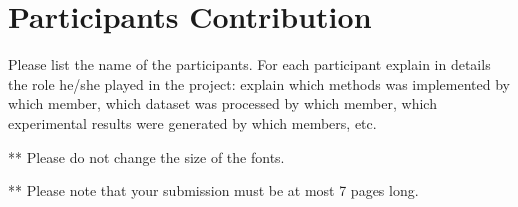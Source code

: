 \documentclass[11.5pt]{article}
\begin{document}
\section{Participants Contribution}
Please list the name of the participants. For each participant explain in details the role he/she played in the project: explain which methods was implemented by which member, which dataset was processed by which member, which experimental results were generated by which members, etc.

\vspace{10mm}
** Please do not change the size of the fonts.

** Please note that your submission must be at most 7 pages long.
\end{document}
